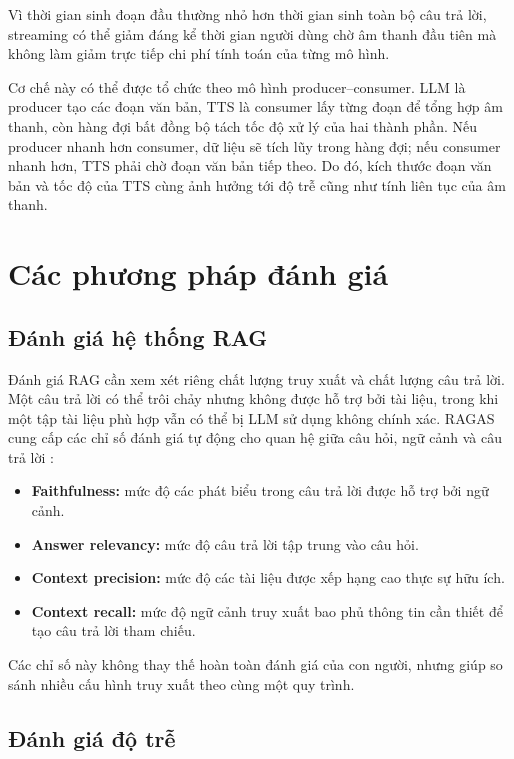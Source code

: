 \documentclass[a4paper,13pt,oneside]{report}
\begin{document}
Vì thời gian sinh đoạn đầu thường nhỏ hơn thời gian sinh toàn bộ câu trả lời, streaming có thể giảm đáng kể thời gian người dùng chờ âm thanh đầu tiên mà không làm giảm trực tiếp chi phí tính toán của từng mô hình.

Cơ chế này có thể được tổ chức theo mô hình producer--consumer. LLM là producer tạo các đoạn văn bản, TTS là consumer lấy từng đoạn để tổng hợp âm thanh, còn hàng đợi bất đồng bộ tách tốc độ xử lý của hai thành phần. Nếu producer nhanh hơn consumer, dữ liệu sẽ tích lũy trong hàng đợi; nếu consumer nhanh hơn, TTS phải chờ đoạn văn bản tiếp theo. Do đó, kích thước đoạn văn bản và tốc độ của TTS cùng ảnh hưởng tới độ trễ cũng như tính liên tục của âm thanh.

\section{Các phương pháp đánh giá}

\subsection{Đánh giá hệ thống RAG}

Đánh giá RAG cần xem xét riêng chất lượng truy xuất và chất lượng câu trả lời. Một câu trả lời có thể trôi chảy nhưng không được hỗ trợ bởi tài liệu, trong khi một tập tài liệu phù hợp vẫn có thể bị LLM sử dụng không chính xác. RAGAS cung cấp các chỉ số đánh giá tự động cho quan hệ giữa câu hỏi, ngữ cảnh và câu trả lời \cite{ragas}:

\begin{itemize}
    \item \textbf{Faithfulness:} mức độ các phát biểu trong câu trả lời được hỗ trợ bởi ngữ cảnh.
    \item \textbf{Answer relevancy:} mức độ câu trả lời tập trung vào câu hỏi.
    \item \textbf{Context precision:} mức độ các tài liệu được xếp hạng cao thực sự hữu ích.
    \item \textbf{Context recall:} mức độ ngữ cảnh truy xuất bao phủ thông tin cần thiết để tạo câu trả lời tham chiếu.
\end{itemize}

Các chỉ số này không thay thế hoàn toàn đánh giá của con người, nhưng giúp so sánh nhiều cấu hình truy xuất theo cùng một quy trình.

\subsection{Đánh giá độ trễ}
\end{document}
